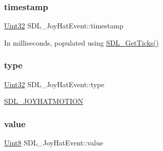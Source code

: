 \subsubsection{\texorpdfstring{timestamp}{timestamp}}
{\footnotesize\ttfamily \hyperlink{_s_d_l__stdinc_8h_add440eff171ea5f55cb00c4a9ab8672d}{Uint32} S\+D\+L\+\_\+\+Joy\+Hat\+Event\+::timestamp}

In milliseconds, populated using \hyperlink{_s_d_l__timer_8h_a0b9bc71d6287e0ffafdc3419760fe2b3}{S\+D\+L\+\_\+\+Get\+Ticks()} \mbox{\label{struct_s_d_l___joy_hat_event_ac583dafab46c44354e210a542aff57cc}} 
\subsubsection{\texorpdfstring{type}{type}}
{\footnotesize\ttfamily \hyperlink{_s_d_l__stdinc_8h_add440eff171ea5f55cb00c4a9ab8672d}{Uint32} S\+D\+L\+\_\+\+Joy\+Hat\+Event\+::type}

\hyperlink{_s_d_l__events_8h_a3b589e89be6b35c02e0dd34a55f3fccaafba4080bfbad335e520097b2024f0dff}{S\+D\+L\+\_\+\+J\+O\+Y\+H\+A\+T\+M\+O\+T\+I\+ON} \mbox{\label{struct_s_d_l___joy_hat_event_a52b179a34407449941b61d988ca72ef4}} 
\subsubsection{\texorpdfstring{value}{value}}
{\footnotesize\ttfamily \hyperlink{_s_d_l__stdinc_8h_a2944638813a090aa23e62f4da842c3e2}{Uint8} S\+D\+L\+\_\+\+Joy\+Hat\+Event\+::value}

